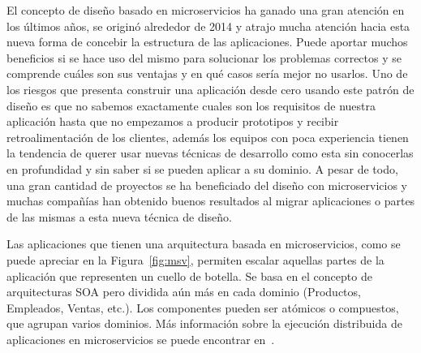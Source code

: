 El concepto de diseño basado en microservicios ha ganado una gran atención en los últimos años, se originó alrededor de 2014 y atrajo mucha atención hacia esta nueva forma de concebir la estructura de las aplicaciones. Puede aportar muchos beneficios si se hace uso del mismo para solucionar los problemas correctos y se comprende cuáles son sus ventajas y en qué casos sería mejor no usarlos. Uno de los riesgos que presenta construir una aplicación desde cero usando este patrón de diseño es que no sabemos exactamente cuales son los requisitos de nuestra aplicación hasta que no empezamos a producir prototipos y recibir retroalimentación de los clientes, además los equipos con poca experiencia tienen la tendencia de querer usar nuevas técnicas de desarrollo como esta sin conocerlas en profundidad y sin saber si se pueden aplicar a su dominio. A pesar de todo, una gran cantidad de proyectos se ha beneficiado del diseño con microservicios y muchas compañías han obtenido buenos resultados al migrar aplicaciones o partes de las mismas a esta nueva técnica de diseño. 

Las aplicaciones que tienen una arquitectura basada en microservicios, como se puede apreciar en la Figura~\ref{fig:msv}, permiten escalar aquellas partes de la aplicación que representen un cuello de botella. Se basa en el concepto de arquitecturas SOA pero dividida aún más en cada dominio (Productos, Empleados, Ventas, etc.). Los componentes pueden ser atómicos o compuestos, que agrupan varios dominios. Más información sobre la ejecución distribuida de aplicaciones en microservicios se puede encontrar en~\cite{mservices}.

